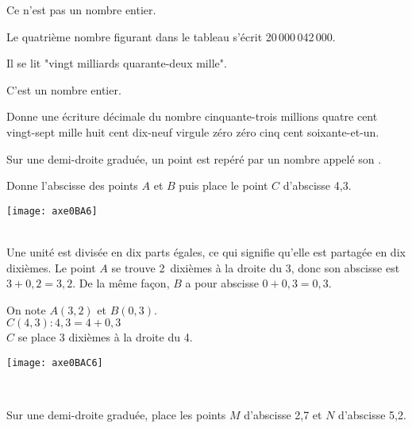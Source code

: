 \begin{methode*1}
\begin{exemple*1}
Ce n’est pas un nombre entier.
\end{exemple*1}

\begin{exemple*1}
Le quatrième nombre figurant dans le tableau s’écrit 20\,000\,042\,000.

Il se lit "vingt milliards quarante-deux mille".

C’est un nombre entier.
\end{exemple*1}

\exercice 
Donne une écriture décimale du nombre cinquante-trois millions quatre cent vingt-sept mille huit cent dix-neuf virgule zéro zéro cinq cent soixante-et-un.

\end{methode*1}


\begin{methode*1}

\begin{aconnaitre}
Sur une demi-droite graduée, un point est repéré par un nombre appelé son \textbf{}.
\end{aconnaitre}

\begin{exemple*1}

\vspace{0.5cm}

 \begin{minipage}[c]{.46\textwidth}
 Donne l'abscisse des points $A$ et $B$ puis place le point $C$ d'abscisse 4,3.
  \end{minipage}\hfill%
 \begin{minipage}[c]{.46\textwidth} 
\texttt{[image: axe0BA6]}
 \end{minipage}\\

Une unité est divisée en dix parts égales, ce qui signifie qu'elle est partagée en dix dixièmes. Le point $A$ se trouve 2 dixièmes à la droite du 3, donc son abscisse est $3 + 0,2 = 3,2$. De la même façon, $B$ a pour abscisse $0 + 0,3 = 0,3$. \\

  \begin{minipage}[c]{.46\textwidth}
On note $A(3,2)$ et $B(0,3)$.\\
$C(4,3) : 4,3 = 4 + 0,3$\\
$C$ se place 3 dixièmes à la droite du 4.
  \end{minipage}\hfill%
 \begin{minipage}[c]{.46\textwidth} 
\texttt{[image: axe0BAC6]}
 \end{minipage}\\

\end{exemple*1}

\exercice 
Sur une demi-droite graduée, place les points $M$ d'abscisse 2,7 et $N$ d'abscisse 5,2.

\end{methode*1}

